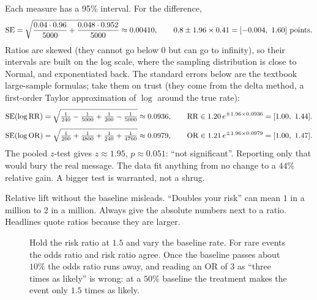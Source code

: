 Each measure has a 95\% interval. For the difference,
\[
  \operatorname{SE}=\sqrt{\frac{0.04\cdot0.96}{5000}+\frac{0.048\cdot0.952}{5000}}\approx 0.00410,
  \qquad 0.8 \pm 1.96\times 0.41 = [-0.004,\ 1.60]\text{ points}.
\]
Ratios are skewed (they cannot go below $0$ but can go to infinity), so their
intervals are built on the log scale, where the sampling distribution is close to
Normal, and exponentiated back. The standard errors below are the textbook
large-sample formulas; take them on trust (they come from the delta method, a
first-order Taylor approximation of $\log$ around the true rate):
\[
  \SE(\log \mathrm{RR}) = \sqrt{\tfrac{1}{240}-\tfrac{1}{5000}+\tfrac{1}{200}-\tfrac{1}{5000}} \approx 0.0936,
  \qquad
  \mathrm{RR}\in 1.20\, e^{\pm 1.96\times 0.0936} = [1.00,\ 1.44].
\]
\[
  \SE(\log \mathrm{OR}) = \sqrt{\tfrac{1}{200}+\tfrac{1}{4800}+\tfrac{1}{240}+\tfrac{1}{4760}} \approx 0.0979,
  \qquad
  \mathrm{OR}\in 1.21\, e^{\pm 1.96\times 0.0979} = [1.00,\ 1.47].
\]
The pooled $z$-test gives $z\approx1.95$, $p\approx0.051$: ``not significant''.
Reporting only that would bury the real message. The data fit anything from no change
to a $44\%$ relative gain. A bigger test is warranted, not a shrug.

\begin{trapbox}
Relative lift without the baseline misleads. ``Doubles your risk'' can mean
$1$ in a million to $2$ in a million. Always give the absolute numbers next to a
ratio. Headlines quote ratios because they are larger.
\end{trapbox}

\begin{figure}[H]
\centering
{}
\caption{Hold the risk ratio at $1.5$ and vary the baseline rate. For rare events
the odds ratio and risk ratio agree. Once the baseline passes about $10\%$ the
odds ratio runs away, and reading an OR of $3$ as ``three times as likely'' is
wrong: at a $50\%$ baseline the treatment makes the event only $1.5$ times as likely.}
\label{fig:pitfalls-orrr}
\end{figure}

